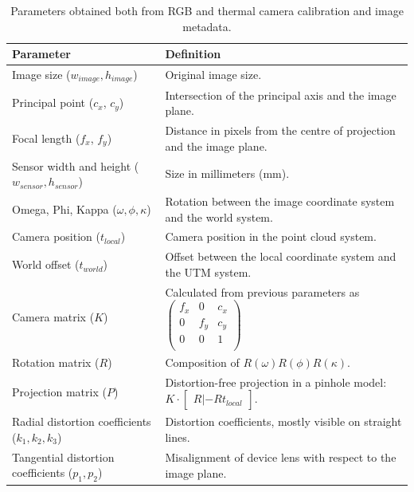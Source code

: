 \renewcommand{\arraystretch}{1.15}
\begin{table}
    \caption{Parameters obtained both from RGB and thermal camera calibration and image metadata.}
    \label{table:thermal_pc_attributes}
    \begin{tabular}{@{}ll@{}}
    \toprule
    Parameter & Definition\\
    \midrule
    Image size ($w_{\textit{image}}, h_{\textit{image}}$) & Original image size.\\
    Principal point ($c_x$, $c_y$) & Intersection of the principal axis and the image plane. \\
    Focal length ($f_x$, $f_y$) & Distance in pixels from the centre of projection and the image plane. \\
    Sensor width and height ($w_{\textit{sensor}}, h_{\textit{sensor}}$) & Size in millimeters (\si{\milli\meter}). \\
    Omega, Phi, Kappa ($\omega, \phi, \kappa$) & Rotation between the image coordinate system and the world system. \\
    Camera position ($t_{\textit{local}}$) & Camera position in the point cloud system.\\
    World offset ($t_{\textit{world}}$) & Offset between the local coordinate system and the UTM system.\\
    Camera matrix ($K$) & Calculated from previous parameters as $\begin{pmatrix} f_x & 0 & c_x\\ 0 & f_y & c_y\\ 0 & 0 & 1\\ \end{pmatrix}$ \\
    Rotation matrix ($R$) & Composition of $R(\omega)R(\phi)R(\kappa)$. \\
    Projection matrix ($P$) & Distortion-free projection in a pinhole model: $K \cdot \begin{bmatrix} R|-Rt_{\textit{local}} \end{bmatrix}$. \\
    Radial distortion coefficients ($k_1, k_2, k_3$) & Distortion coefficients, mostly visible on straight lines.\\
    Tangential distortion coefficients ($p_1, p_2$) & Misalignment of device lens with respect to the image plane. \\
    \bottomrule
    \end{tabular}
\end{table}
\renewcommand{\arraystretch}{1}    

